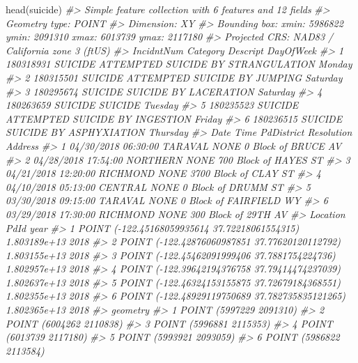 \documentclass[
]{krantz}
\makeatletter
\newenvironment{Shaded}{\begin{snugshade}}{\end{snugshade}}
\newcommand{\CommentTok}[1]{\textcolor[rgb]{0.37,0.37,0.37}{\textit{#1}}}
\newcommand{\FunctionTok}[1]{\textcolor[rgb]{0,0,0}{#1}}
\newcommand{\NormalTok}[1]{#1}
\newenvironment{kframe}{%
\medskip{}
\setlength{\fboxsep}{.8em}
 \def\at@end@of@kframe{}%
 \ifinner\ifhmode%
  \def\at@end@of@kframe{\end{minipage}}%
  \begin{minipage}{\columnwidth}%
 \fi\fi%
 \def\FrameCommand##1{\hskip\@totalleftmargin \hskip-\fboxsep
 \colorbox{shadecolor}{##1}\hskip-\fboxsep
     \hskip-\linewidth \hskip-\@totalleftmargin \hskip\columnwidth}%
 \MakeFramed {\advance\hsize-\width
   \@totalleftmargin\z@ \linewidth\hsize
   \@setminipage}}%
 {\par\unskip\endMakeFramed%
 \at@end@of@kframe}
\renewenvironment{Shaded}{\begin{kframe}}{\end{kframe}}
\makeatother
\begin{document}
\begin{Shaded}
\begin{Highlighting}[]
\FunctionTok{head}\NormalTok{(suicide)}
\CommentTok{\#\textgreater{} Simple feature collection with 6 features and 12 fields}
\CommentTok{\#\textgreater{} Geometry type: POINT}
\CommentTok{\#\textgreater{} Dimension:     XY}
\CommentTok{\#\textgreater{} Bounding box:  xmin: 5986822 ymin: 2091310 xmax: 6013739 ymax: 2117180}
\CommentTok{\#\textgreater{} Projected CRS: NAD83 / California zone 3 (ftUS)}
\CommentTok{\#\textgreater{}   IncidntNum Category                           Descript DayOfWeek}
\CommentTok{\#\textgreater{} 1  180318931  SUICIDE ATTEMPTED SUICIDE BY STRANGULATION    Monday}
\CommentTok{\#\textgreater{} 2  180315501  SUICIDE       ATTEMPTED SUICIDE BY JUMPING  Saturday}
\CommentTok{\#\textgreater{} 3  180295674  SUICIDE              SUICIDE BY LACERATION  Saturday}
\CommentTok{\#\textgreater{} 4  180263659  SUICIDE                            SUICIDE   Tuesday}
\CommentTok{\#\textgreater{} 5  180235523  SUICIDE     ATTEMPTED SUICIDE BY INGESTION    Friday}
\CommentTok{\#\textgreater{} 6  180236515  SUICIDE            SUICIDE BY ASPHYXIATION  Thursday}
\CommentTok{\#\textgreater{}         Date     Time PdDistrict Resolution                 Address}
\CommentTok{\#\textgreater{} 1 04/30/2018 06:30:00    TARAVAL       NONE     0 Block of BRUCE AV}
\CommentTok{\#\textgreater{} 2 04/28/2018 17:54:00   NORTHERN       NONE   700 Block of HAYES ST}
\CommentTok{\#\textgreater{} 3 04/21/2018 12:20:00   RICHMOND       NONE   3700 Block of CLAY ST}
\CommentTok{\#\textgreater{} 4 04/10/2018 05:13:00    CENTRAL       NONE     0 Block of DRUMM ST}
\CommentTok{\#\textgreater{} 5 03/30/2018 09:15:00    TARAVAL       NONE 0 Block of FAIRFIELD WY}
\CommentTok{\#\textgreater{} 6 03/29/2018 17:30:00   RICHMOND       NONE    300 Block of 29TH AV}
\CommentTok{\#\textgreater{}                                         Location         PdId year}
\CommentTok{\#\textgreater{} 1  POINT ({-}122.45168059935614 37.72218061554315) 1.803189e+13 2018}
\CommentTok{\#\textgreater{} 2  POINT ({-}122.42876060987851 37.77620120112792) 1.803155e+13 2018}
\CommentTok{\#\textgreater{} 3   POINT ({-}122.45462091999406 37.7881754224736) 1.802957e+13 2018}
\CommentTok{\#\textgreater{} 4  POINT ({-}122.39642194376758 37.79414474237039) 1.802637e+13 2018}
\CommentTok{\#\textgreater{} 5  POINT ({-}122.46324153155875 37.72679184368551) 1.802355e+13 2018}
\CommentTok{\#\textgreater{} 6 POINT ({-}122.48929119750689 37.782735835121265) 1.802365e+13 2018}
\CommentTok{\#\textgreater{}                  geometry}
\CommentTok{\#\textgreater{} 1 POINT (5997229 2091310)}
\CommentTok{\#\textgreater{} 2 POINT (6004262 2110838)}
\CommentTok{\#\textgreater{} 3 POINT (5996881 2115353)}
\CommentTok{\#\textgreater{} 4 POINT (6013739 2117180)}
\CommentTok{\#\textgreater{} 5 POINT (5993921 2093059)}
\CommentTok{\#\textgreater{} 6 POINT (5986822 2113584)}
\end{Highlighting}
\end{Shaded}
\end{document}
